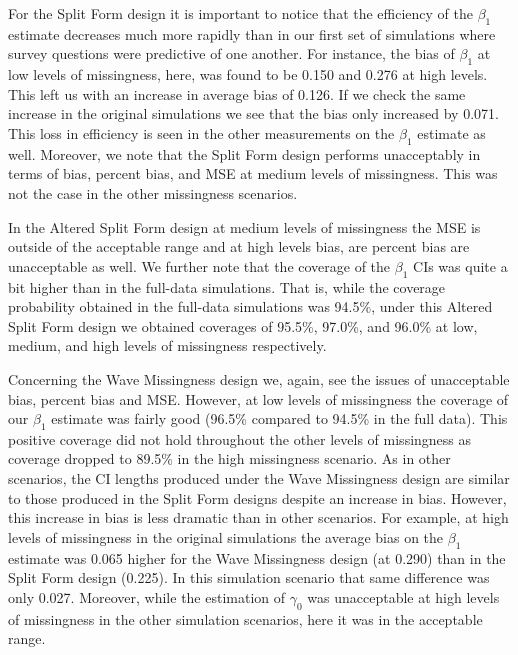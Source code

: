 \documentclass{svjour3}                     %
\begin{document}
For the Split Form design it is important to notice that the efficiency of the $\beta_1$ estimate decreases much more rapidly than in our first set of simulations where survey questions were predictive of one another. For instance, the bias of $\beta_1$ at low levels of missingness, here, was found to be 0.150 and 0.276 at high levels. This left us with an increase in average bias of 0.126. If we check the same increase in the original simulations we see that the bias only increased by 0.071. This loss in efficiency is seen in the other measurements on the $\beta_1$ estimate as well. Moreover, we note that the Split Form design performs unacceptably in terms of bias, percent bias, and MSE at medium levels of missingness. This was not the case in the other missingness scenarios. \par

In the Altered Split Form design at medium levels of missingness the MSE is outside of the acceptable range and at high levels bias, are percent bias are unacceptable as well. We further note that the coverage of the $\beta_1$ CIs was quite a bit higher than in the full-data simulations. That is, while the coverage probability obtained in the full-data simulations was 94.5\%, under this Altered Split Form design we obtained coverages of 95.5\%, 97.0\%, and 96.0\% at low, medium, and high levels of missingness respectively. \par

Concerning the Wave Missingness design we, again, see the issues of unacceptable bias, percent bias and MSE. However, at low levels of missingness the coverage of our $\beta_1$ estimate was fairly good (96.5\% compared to 94.5\% in the full data). This positive coverage did not hold throughout the other levels of missingness as coverage dropped to 89.5\% in the high missingness scenario. As in other scenarios, the CI lengths produced under the Wave Missingness design are similar to those produced in the Split Form designs despite an increase in bias. However, this increase in bias is less dramatic than in other scenarios. For example, at high levels of missingness in the original simulations the average bias on the $\beta_1$ estimate was 0.065 higher for the Wave Missingness design (at 0.290) than in the Split Form design (0.225). In this simulation scenario that same difference was only 0.027. Moreover, while the estimation of $\gamma_0$ was unacceptable at high levels of missingness in the other simulation scenarios, here it was in the acceptable range.\par
\end{document}
